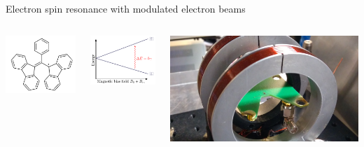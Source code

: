 \documentclass[final]{beamer}
\begin{document}
\begin{frame}[fragile]{}
\begin{columns}[T]
\begin{column}{.49\linewidth}
\begin{block}{\Large Electron spin resonance with modulated electron beams}
        \begin{columns}
          \begin{column}{0.3\columnwidth}
            \includegraphics[width=0.67\columnwidth]{figures/bdpa.png}
          \end{column}
          \begin{column}{0.3\columnwidth}
            \includegraphics[width=\columnwidth]{figures/zeeman.pdf}
          \end{column}
          \begin{column}{0.4\columnwidth}
            \includegraphics[width=\columnwidth]{figures/esrsetuppcb.jpg}
          \end{column}
        \end{columns}


\end{block}
\end{column}
\end{columns}
\end{frame}
\end{document}
